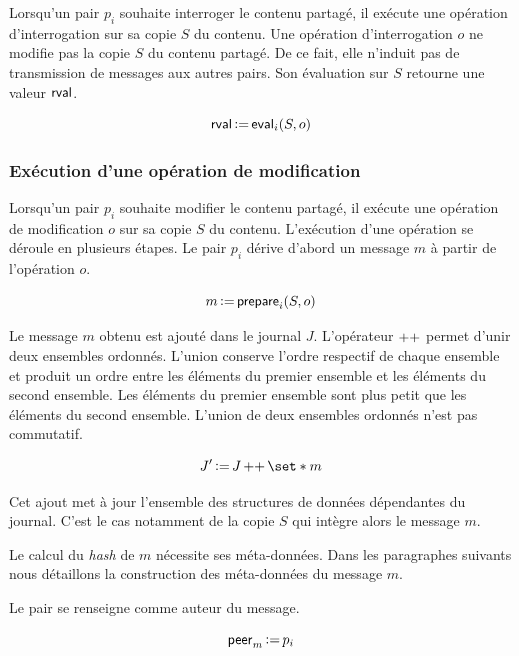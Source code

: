 Lorsqu'un pair $p_i$ souhaite interroger le contenu partagé, il exécute une opération d'interrogation sur sa copie $S$ du contenu.
Une opération d'interrogation $o$ ne modifie pas la copie $S$ du contenu partagé.
De ce fait, elle n'induit pas de transmission de messages aux autres pairs.
Son évaluation sur $S$ retourne une valeur $\operatorname{\mathsf{rval}}$.

\begin{equation*}
    \operatorname{\mathsf{rval}} \operatorname{\vcentcolon=} \operatorname{\mathsf{eval}}_i(S, o)
\end{equation*}


\subsubsection{Exécution d'une opération de modification}

Lorsqu'un pair $p_i$ souhaite modifier le contenu partagé, il exécute une opération de modification $o$ sur sa copie $S$ du contenu.
L'exécution d'une opération se déroule en plusieurs étapes.
Le pair $p_i$ dérive d'abord un message $m$ à partir de l'opération $o$.

\begin{equation*}
    m \operatorname{\vcentcolon=} \operatorname{\mathsf{prepare}}_i(S, o)
\end{equation*}

Le message $m$ obtenu est ajouté dans le journal $J$.
L'opérateur $\operatorname{\mathsf{\operatorname{++}}}$ permet d'unir deux ensembles ordonnés.
L'union conserve l'ordre respectif de chaque ensemble et produit un ordre entre les éléments du premier ensemble et les éléments du second ensemble.
Les éléments du premier ensemble sont plus petit que les éléments du second ensemble.
L'union de deux ensembles ordonnés n'est pas commutatif.

\begin{equation*}
    J' \assign J \lappend \set*{m}
\end{equation*}

Cet ajout met à jour l'ensemble des structures de données dépendantes du journal.
C'est le cas notamment de la copie $S$ qui intègre alors le message $m$.

Le calcul du \emph{hash} de $m$ nécessite ses méta-données.
Dans les paragraphes suivants nous détaillons la construction des méta-données du message $m$.

Le pair se renseigne comme auteur du message.

\begin{equation*}
    \operatorname{\mathsf{peer}}_m \operatorname{\vcentcolon=} p_i
\end{equation*}

